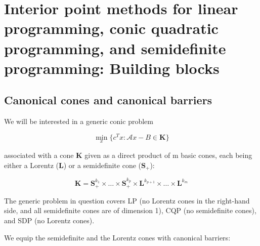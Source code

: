\documentclass[11pt,a4paper]{article}
\begin{document}
\section{Interior point methods for linear programming, conic quadratic programming, and semidefinite programming: Building blocks}

\subsection{Canonical cones and canonical barriers}

We will be interested in a generic conic problem

\begin{equation}
    \underset{x}{\min} \{c^Tx : \mathcal{A}x-B \in \textbf{K}\} \tag{CP}
\end{equation}

associated with a cone $\textbf{K}$ given as a direct product of m basic cones, each being either a Lorentz ($\textbf{L}$) or a semidefinite cone ($\textbf{S}_{+}$):

\begin{equation*}\label{eq:cone}
    \textbf{K} = \textbf{S}_+^{k_1}\times\dots\times\textbf{S}_+^{k_p}\times\textbf{L}^{k_{p+1}}\times\dots\times\textbf{L}^{k_{m}} \tag{Cone}
\end{equation*}

The generic problem in question covers LP (no Lorentz cones in the right-hand side, and all semidefinite cones are of dimension 1), CQP (no semidefinite cones), and SDP (no Lorentz cones).

We equip the semidefinite and the Lorentz cones with canonical barriers:
\end{document}
